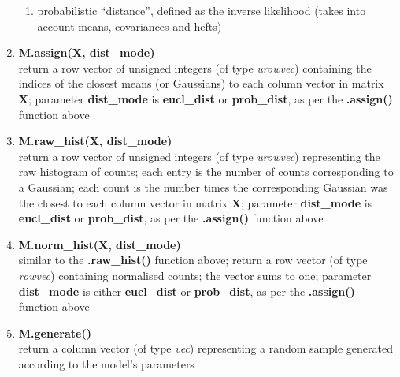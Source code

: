 \documentclass[10pt,a4paper]{article}
\begin{document}
\begin{small}
\begin{enumerate}[{$\bullet$}]
\begin{small}
\begin{enumerate}
\item
probabilistic ``distance'', defined as the inverse likelihood (takes into account means, covariances and hefts)
\end{enumerate}
\end{small}


\item
{\bf M.assign(X, dist\_mode)}\\
return a row vector of unsigned integers (of type {\it urowvec}) containing the indices of the closest means (or Gaussians) to each column vector in matrix {\bf X};
parameter {\bf dist\_mode} is {\bf eucl\_dist} or {\bf prob\_dist}, as per the {\bf .assign()} function above

\item
{\bf M.raw\_hist(X, dist\_mode)}\\
return a row vector of unsigned integers (of type {\it urowvec}) representing the raw histogram of counts;
each entry is the number of counts corresponding to a Gaussian;
each count is the number times the corresponding Gaussian was the closest to each column vector in matrix {\bf X};
parameter {\bf dist\_mode} is {\bf eucl\_dist} or {\bf prob\_dist}, as per the {\bf .assign()} function above

\item
{\bf M.norm\_hist(X, dist\_mode)}\\
similar to the {\bf .raw\_hist()} function above; return a row vector (of type {\it rowvec}) containing normalised counts; the vector sums to one;
parameter {\bf dist\_mode} is either {\bf eucl\_dist} or {\bf prob\_dist}, as per the {\bf .assign()} function above

\item
{\bf M.generate()}\\
return a column vector (of type {\it vec}) representing a random sample generated according to the model's parameters


\end{enumerate}
\end{small}
\end{document}
